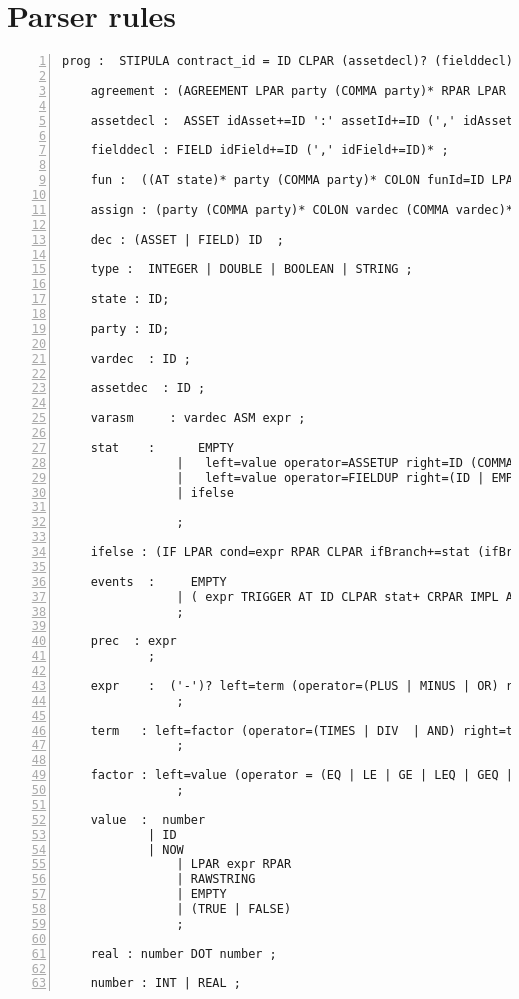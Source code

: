 \section{Parser rules}
\begin{Verbatim}[numbers=left,xleftmargin=1cm,firstnumber=1,breaklines=true,breakanywhere=true,tabsize=2]
	prog :  STIPULA contract_id = ID CLPAR (assetdecl)? (fielddecl)? INIT init_state = ID agreement (fun)+ CRPAR ; 

	agreement : (AGREEMENT LPAR party (COMMA party)* RPAR LPAR vardec (COMMA vardec)* RPAR CLPAR (assign)+ CRPAR IMPL AT state);

	assetdecl :  ASSET idAsset+=ID ':' assetId+=ID (',' idAsset+=ID ':' assetId+=ID)* ;

	fielddecl : FIELD idField+=ID (',' idField+=ID)* ;

	fun	:  ((AT state)* party (COMMA party)* COLON funId=ID LPAR (vardec ( COMMA vardec)* )? RPAR SLPAR (assetdec ( COMMA assetdec)* )? SRPAR (LPAR prec RPAR)? CLPAR (stat)+ SEMIC (events)+ CRPAR IMPL AT state )   ;
			
	assign : (party (COMMA party)* COLON vardec (COMMA vardec)*);

	dec : (ASSET | FIELD) ID  ;

	type :  INTEGER | DOUBLE | BOOLEAN | STRING ;

	state : ID;

	party : ID;

	vardec  : ID ;

	assetdec  : ID ;

	varasm     : vardec ASM expr ;
	
	stat 	:      EMPTY
				|   left=value operator=ASSETUP right=ID (COMMA rightPlus=ID)?  
				|   left=value operator=FIELDUP right=(ID | EMPTY) 
				| ifelse
				
				;
				
	ifelse : (IF LPAR cond=expr RPAR CLPAR ifBranch+=stat (ifBranch+=stat)* CRPAR (ELSEIF condElseIf+=expr CLPAR elseIfBranch+=stat (elseIfBranch+=stat)* CRPAR)* (ELSE CLPAR elseBranch+=stat (elseBranch+=stat)* CRPAR )?);

	events	:     EMPTY
				| ( expr TRIGGER AT ID CLPAR stat+ CRPAR IMPL AT ID )
				;
				
	prec  : expr 
			;			
				
	expr 	:  ('-')? left=term (operator=(PLUS | MINUS | OR) right=expr)?
				;
		
	term   : left=factor (operator=(TIMES | DIV  | AND) right=term)?
				;
				
	factor : left=value (operator = (EQ | LE | GE | LEQ | GEQ | NEQ ) right=value)?
				;       
				
	value  :  number    
			| ID
			| NOW
				| LPAR expr RPAR                      
				| RAWSTRING
				| EMPTY
				| (TRUE | FALSE)				
				;      

	real : number DOT number ; 
				
	number : INT | REAL ;
\end{Verbatim}
